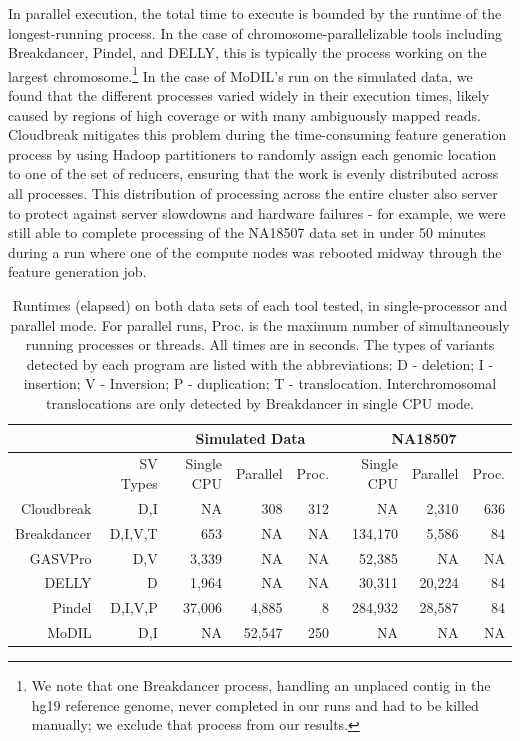 \documentclass[11pt]{article}
\begin{document}
In parallel execution, the total time to execute is bounded by the runtime of the longest-running process. In the case of chromosome-parallelizable tools including Breakdancer, Pindel, and DELLY, this is typically the process working on the largest chromosome.\footnote{We note that one Breakdancer process, handling an unplaced contig in the hg19 reference genome, never completed in our runs and had to be killed manually; we exclude that process from our results.} In the case of MoDIL's run on the simulated data, we found that the different processes varied widely in their execution times, likely caused by regions of high coverage or with many ambiguously mapped reads. Cloudbreak mitigates this problem during the time-consuming feature generation process by using Hadoop partitioners to randomly assign each genomic location to one of the set of reducers, ensuring that the work is evenly distributed across all processes. This distribution of processing across the entire cluster also server to protect against server slowdowns and hardware failures - for example, we were still able to complete processing of the NA18507 data set in under 50 minutes during a run where one of the compute nodes was rebooted midway through the feature generation job.

\begin{table}
\begin{center}
\begin{tabular}{r|r|rrr|rrr}
\multicolumn{2}{c}{}  & \multicolumn{3}{c}{Simulated Data} & \multicolumn{3}{c}{NA18507} \\
\hline
 & SV Types &  Single CPU & Parallel & Proc. &  Single CPU & Parallel & Proc.  \\ 
  \hline
  Cloudbreak & D,I &   NA    & 308 & 312    & NA         & 2,310 & 636 \\ 
  Breakdancer & D,I,V,T &  653   & NA       & NA          & 134,170 &  5,586 & 84 \\
  GASVPro & D,V   &  3,339  & NA       & NA         & 52,385  & NA & NA \\
  DELLY & D         &  1,964 & NA          & NA      & 30,311  & 20,224 & 84 \\
  Pindel & D,I,V,P         & 37,006 &  4,885     & 8          &  284,932  & 28,587 & 84 \\ 
  MoDIL & D,I        &  NA      & 52,547 & 250 & NA         & NA  & NA\\ 
   \hline
\end{tabular}
\end{center}
\caption{Runtimes (elapsed) on both data sets of each tool tested, in single-processor and parallel mode. For parallel runs, Proc. is the maximum number of simultaneously running processes or threads. All times are in seconds. The types of variants detected by each program are listed with the abbreviations: D - deletion; I - insertion; V - Inversion; P - duplication; T - translocation. Interchromosomal translocations are only detected by Breakdancer in single CPU mode. }
\label{runtimes}
\end{table}
\end{document}
